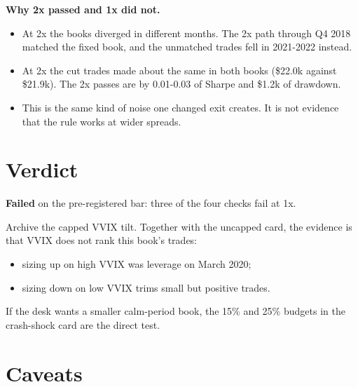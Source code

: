 \documentclass{article}
\begin{document}
\textbf{Why 2x passed and 1x did not.}

\begin{itemize}

\item At 2x the books diverged in different months. The 2x path through Q4 2018 matched the fixed book, and the unmatched trades fell in 2021-2022 instead.

\item At 2x the cut trades made about the same in both books (\$22.0k against \$21.9k). The 2x passes are by 0.01-0.03 of Sharpe and \$1.2k of drawdown.

\item This is the same kind of noise one changed exit creates. It is not evidence that the rule works at wider spreads.

\end{itemize}

\section{Verdict}

\textbf{Failed} on the pre-registered bar: three of the four checks fail at 1x.

Archive the capped VVIX tilt. Together with the uncapped card, the evidence is that VVIX does not rank this book's trades:

\begin{itemize}

\item sizing up on high VVIX was leverage on March 2020;

\item sizing down on low VVIX trims small but positive trades.

\end{itemize}

If the desk wants a smaller calm-period book, the 15\% and 25\% budgets in the crash-shock card are the direct test.

\section{Caveats}
\end{document}
